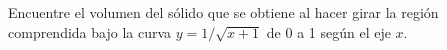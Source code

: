 \item Encuentre el volumen del sólido que se obtiene al hacer girar la región comprendida bajo la curva $y = 1/\sqrt{x + 1}$ de 0 a 1 según el eje $x$.
